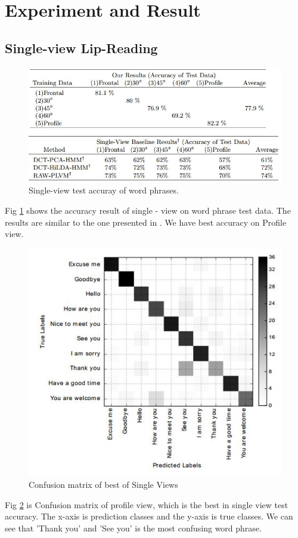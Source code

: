 \section{Experiment and Result}


\subsection{Single-view Lip-Reading}

\begin{figure}[h]
	\centering
	\includegraphics[width=\columnwidth]{fig/s1.jpg}
	\caption{Single-view test accuray of word phrases.}
	\label{fig:s1}
\end{figure}
Fig \ref{fig:s1} shows the accuracy result of single - view on word phrase test data. The results are similar to the one presented in \cite{Lee}. We have best accuracy on Profile view.

\begin{figure}[h]
	\centering
	\includegraphics[width=\columnwidth]{fig/s2.jpg}
	\caption{Confusion matrix of best of Single Views}
	\label{fig:s2}
\end{figure}
Fig \ref{fig:s2} is Confusion matrix of profile view, which is the best in single view test accuracy. The x-axis is prediction classes and the y-axis is true classes.
We can see that 'Thank you' and 'See you' is the most confusing word phrase.


